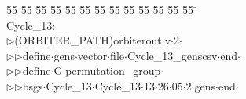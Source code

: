 %
%
\begin{tabbing}
55 \= 55 \= 55 \= 55 \= 55 \= 55 \= 55 \= 55 \= 55 \= 55 \= 55 \= 55 \= 55 \= \kill
\\[0pt]
Cycle\_13:\\[0pt]
$\triangleright$\>(ORBITER\_PATH)orbiterout$\cdot$v$\cdot$2$\cdot$\\[0pt]
$\triangleright$\>$\triangleright$\>define$\cdot$gens$\cdot$vector$\cdot$file$\cdot$Cycle\_13\_genscsv$\cdot$end$\cdot$\\[0pt]
$\triangleright$\>$\triangleright$\>define$\cdot$G$\cdot$permutation\_group$\cdot$\\[0pt]
$\triangleright$\>$\triangleright$\>bsgs$\cdot$Cycle\_13$\cdot$Cycle\_13$\cdot$13$\cdot$26$\cdot$05$\cdot$2$\cdot$gens$\cdot$end$\cdot$\\[0pt]
\end{tabbing}
